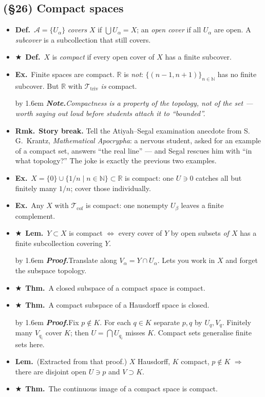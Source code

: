 \documentclass[12pt,a4paper]{article}
\newcommand{\Dfn}{\textbf{Def.}~}
\newcommand{\Thm}{\textbf{Thm.}~}
\newcommand{\Lem}{\textbf{Lem.}~}
\newcommand{\Exa}{\textbf{Ex.}~}
\newcommand{\Rmk}{\textbf{Rmk.}~}
\newcommand{\Key}{$\bigstar$~}                  %
\newcommand{\Pf}[1]{%
  \par\addvspace{7pt}\nopagebreak
  \begingroup
    \advance\leftskip by 1.6em
    \parindent=0pt \small\color{prf}%
    \textbf{\textit{Proof.}}\enspace #1\par
  \endgroup
  \addvspace{9pt}}
\newcommand{\Cue}[1]{%
  \par\addvspace{7pt}\nopagebreak
  \begingroup
    \advance\leftskip by 1.6em
    \parindent=0pt \small\color{cue}%
    \textbf{\textit{Note.}}\enspace \textit{#1}\par
  \endgroup
  \addvspace{9pt}}
\newenvironment{BL}%
  {\begin{itemize}[leftmargin=1.4em,labelsep=0.55em,itemsep=11pt,topsep=11pt,parsep=0pt]}%
  {\end{itemize}}
\newcommand{\RR}{\mathbb{R}}
\newcommand{\NN}{\mathbb{N}}
\newcommand{\cT}{\mathcal{T}}
\newcommand{\cA}{\mathcal{A}}
\renewcommand{\iff}{\Leftrightarrow}
\newcommand{\imp}{\Rightarrow}
\newcommand{\Ttriv}{\cT_{\mathrm{triv}}}
\newcommand{\Tcof}{\cT_{\mathrm{cof}}}
\begin{document}
\subsection{(\S26) Compact spaces}

\begin{BL}
\item \Dfn $\cA=\{U_\alpha\}$ \emph{covers} $X$ if $\bigcup U_\alpha=X$;
      an \emph{open cover} if all $U_\alpha$ are open.
      A \emph{subcover} is a subcollection that still covers.
\item \Key\Dfn $X$ is \emph{compact} if every open cover of $X$ has a finite subcover.
\item \Exa Finite spaces are compact. $\RR$ is \emph{not}: $\{(n-1,n+1)\}_{n\in\NN}$
      has no finite subcover. But $\RR$ with $\Ttriv$ \emph{is} compact.
\Cue{Compactness is a property of the topology, not of the set --- worth saying out loud
before students attach it to ``bounded''.}
\item \Rmk \textbf{Story break.} Tell the Atiyah--Segal examination anecdote from
      S.\,G.\ Krantz, \emph{Mathematical Apocrypha}: a nervous student, asked for an example of
      a compact set, answers ``the real line'' --- and Segal rescues him with
      ``in what topology?'' The joke is exactly the previous two examples.
\item \Exa $X=\{0\}\cup\{1/n\mid n\in\NN\}\subset\RR$ is compact:
      one $U\ni0$ catches all but finitely many $1/n$; cover those individually.
\item \Exa Any $X$ with $\Tcof$ is compact: one nonempty $U_\beta$ leaves a finite complement.
\item \Key\Lem $Y\subset X$ is compact $\iff$ every cover of $Y$ by open subsets \emph{of $X$}
      has a finite subcollection covering $Y$.
\Pf{Translate along $V_\alpha=Y\cap U_\alpha$. Lets you work in $X$ and forget the subspace
topology.}
\item \Key\Thm A closed subspace of a compact space is compact.
\item \Key\Thm A compact subspace of a Hausdorff space is closed.
\Pf{Fix $p\notin K$. For each $q\in K$ separate $p,q$ by $U_q,V_q$. Finitely many $V_{q_i}$
cover $K$; then $U=\bigcap U_{q_i}$ misses $K$. Compact sets generalise finite sets here.}
\item \Lem (Extracted from that proof.) $X$ Hausdorff, $K$ compact, $p\notin K$
      $\imp$ there are disjoint open $U\ni p$ and $V\supset K$.
\item \Key\Thm The continuous image of a compact space is compact.

\end{BL}
\end{document}
